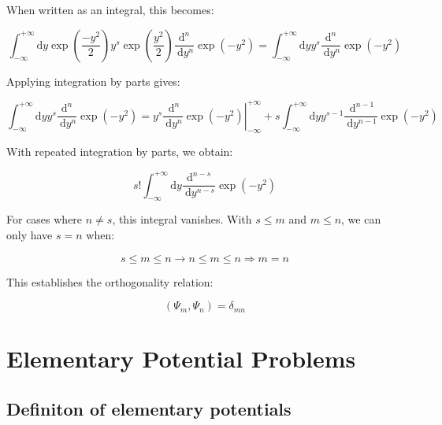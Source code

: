 \documentclass[italian]{HKNdocument}
\begin{document}
When written as an integral, this becomes:

\begin{equation}
\int_{-\infty}^{+\infty} \mathrm{d} y \exp \left(\frac{-y^{2}}{2}\right) y^{s} \exp \left(\frac{y^{2}}{2}\right) \frac{\mathrm{d}^{n}}{\mathrm{~d} y^{n}} \exp \left(-y^{2}\right)=\int_{-\infty}^{+\infty} \mathrm{d} y y^{s} \frac{\mathrm{d}^{n}}{\mathrm{~d} y^{n}} \exp \left(-y^{2}\right) \label{eq:5.71}
\end{equation}

Applying integration by parts gives:

\begin{equation}
\int_{-\infty}^{+\infty} \mathrm{d} y y^{s} \frac{\mathrm{d}^{n}}{\mathrm{~d} y^{n}} \exp \left(-y^{2}\right)=\left.y^{s} \frac{\mathrm{~d}^{n}}{\mathrm{~d} y^{n}} \exp \left(-y^{2}\right)\right|_{-\infty} ^{+\infty}+s \int_{-\infty}^{+\infty} \mathrm{d} y y^{s-1} \frac{\mathrm{~d}^{n-1}}{\mathrm{~d} y^{n-1}} \exp \left(-y^{2}\right) \label{eq:5.72}
\end{equation}

With repeated integration by parts, we obtain:

\begin{equation}
s!\int_{-\infty}^{+\infty} \mathrm{d} y \frac{\mathrm{d}^{n-s}}{\mathrm{~d} y^{n-s}} \exp \left(-y^{2}\right) \label{eq:5.73}
\end{equation}

For cases where $n \neq s$, this integral vanishes. With $s \leq m$ and $m \leq n$, we can only have $s = n$ when:

\begin{equation}
s \leq m \leq n \rightarrow n \leq m \leq n \Longrightarrow m=n \label{eq:5.74}
\end{equation}

This establishes the orthogonality relation:

\begin{equation}
\left(\Psi_{m}, \Psi_{n}\right)=\delta_{m n} \label{eq:5.75}
\end{equation}

\section{Elementary Potential Problems}
\subsection{Definiton of elementary potentials}
\end{document}
